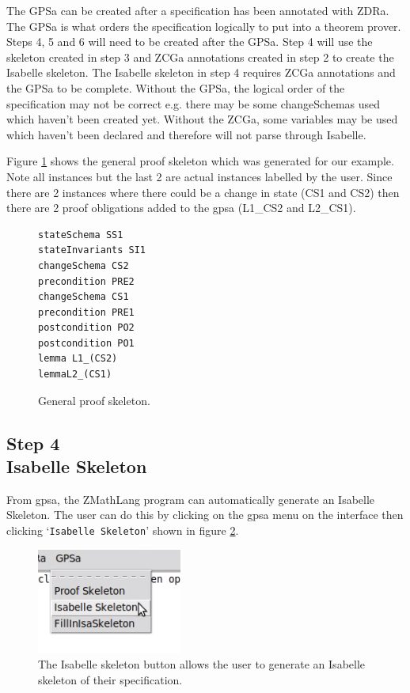 The GPSa can be created after a specification has been annotated with ZDRa. The GPSa is what orders the specification 
logically to put into a theorem prover. Steps 4, 5 and 6 will need to be created after the GPSa. Step 4 will use the skeleton 
created in step 3 and ZCGa annotations created in step 2 to create the Isabelle skeleton. The Isabelle skeleton in
step 4 requires ZCGa annotations and the GPSa to be complete. Without the GPSa, the logical order of the specification may not be correct
e.g. there may be some changeSchemas used which haven't been created yet. Without the ZCGa, some variables may be used which haven't been 
declared and therefore will not parse through Isabelle.

Figure \ref{fig:gpsaFullexample} shows the general proof skeleton which was
generated for our example. Note all instances but the last 2 are actual
instances labelled by the user. Since there are 2 instances where there could be
a change in state (CS1 and CS2) then there are 2 proof obligations added to the
\gls{gpsa} (L1\_CS2 and L2\_CS1).

\begin{figure}[H]
\centering
\begin{scriptsize}
\begin{BVerbatim}
stateSchema SS1
stateInvariants SI1
changeSchema CS2
precondition PRE2
changeSchema CS1
precondition PRE1
postcondition PO2
postcondition PO1
lemma L1_(CS2)
lemmaL2_(CS1) 
\end{BVerbatim}
\end{scriptsize}
\caption{General proof skeleton. \label{fig:gpsaFullexample}}
\end{figure}

\subsection{Step 4\\Isabelle Skeleton}

From \gls{gpsa}, the ZMathLang program can automatically generate an Isabelle
Skeleton. The user can do this by clicking on the \gls{gpsa} menu on the
interface then clicking `\texttt{Isabelle Skeleton}' shown in figure
\ref{fig:isabutton}.

\begin{figure}[H]
\centering
\includegraphics[scale=1]{Figures/fullexample/isaskelbutton.png}
\caption{The Isabelle skeleton button allows the user to generate an Isabelle skeleton of their specification. \label{fig:isabutton}}
\end{figure}

